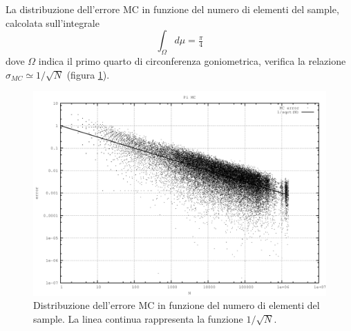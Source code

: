 La distribuzione dell'errore MC in funzione del numero di elementi del sample, calcolata sull'integrale
$$\int_\Omega d\mu = \tfrac{\pi}{4}$$
dove $\Omega$ indica il primo quarto di circonferenza goniometrica, verifica la relazione $\sigma_{MC}\simeq 1/\sqrt N$ (figura \ref{fig:pi}).
\begin{figure}[H]
\centering
\includegraphics[width=\textwidth]{pi}
\caption{Distribuzione dell'errore MC in funzione del numero di elementi del sample. La linea continua rappresenta la funzione $1/\sqrt{N}$.}
\label{fig:pi}
\end{figure}

